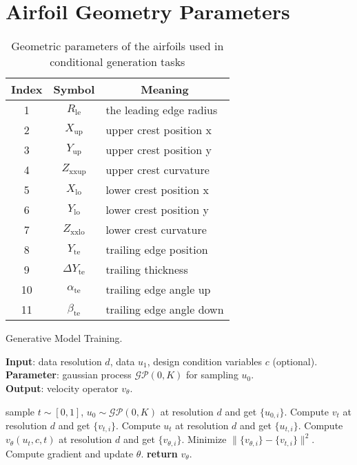 \section{Airfoil Geometry Parameters}

\label{app:groparams}
\begin{table}[h]
    \centering
    \renewcommand{\arraystretch}{1.2} %
    \caption{Geometric parameters of the airfoils used in conditional generation tasks}
    \begin{tabularx}{\linewidth}{ccX}
        \toprule
        \textbf{Index} & Symbol & \multicolumn{1}{c}{Meaning} \\
        \midrule
        1 & $R_{\mathrm{le}}$ & the leading edge radius \\
        2 & $X_{\mathrm{up}}$ & upper crest position x \\
        3 & $Y_{\mathrm{up}}$ & upper crest position y \\
        4 & $Z_{\mathrm{xxup}}$ & upper crest curvature \\
        5 & $X_{\mathrm{lo}}$ & lower crest position x \\
        6 & $Y_{\mathrm{lo}}$ & lower crest position y \\
        7 & $Z_{\mathrm{xxlo}}$ & lower crest curvature \\
        8 & $Y_{\mathrm{te}}$ & trailing edge position \\
        9 & $\Delta Y_{\mathrm{te}}$ & trailing thickness \\
        10 & $\alpha_{\mathrm{te}}$ & trailing edge angle up \\
        11 & $\beta_{\mathrm{te}}$ & trailing edge angle down \\
        \bottomrule
    \end{tabularx}
    \label{tab:geoparams}
\end{table}

\begin{algorithm}[h]
    \caption{Generative Model Training.}
    \label{alg:pretrain}
    \textbf{Input}: data resolution $d$, data $u_1$, design condition variables $c$ (optional).\\
    \textbf{Parameter}: gaussian process $\mathcal{GP}(0,K)$ for sampling $u_0$.\\
    \textbf{Output}: velocity operator $v_{\theta}$. \\
    \begin{algorithmic}[1] %
        \STATE sample $t\sim[0,1]$, $u_0\sim\mathcal{GP}(0,K)$ at resolution $d$ and get $\{u_{0,i}\}$.
        \STATE Compute $v_t$ at resolution $d$ and get $\{v_{t,i}\}$.
        \STATE Compute $u_t$ at resolution $d$ and get $\{u_{t,i}\}$.
        \STATE Compute $v_{\theta}(u_t,c,t)$ at resolution $d$ and get $\{v_{\theta,i}\}$.
        \STATE Minimize $\|\{v_{\theta,i}\}-\{v_{t,i}\}\|^2$.
        \STATE Compute gradient and update $\theta$.
        \ENDWHILE
        \STATE \textbf{return} $v_{\theta}$.
    \end{algorithmic}
\end{algorithm}

